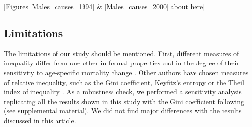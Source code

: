 \documentclass{article}
\begin{document}
\begin{spacing}{1.5}
\begin{center}
[Figures \ref{Males_causes_1994} \& \ref{Males_causes_2000} about here]\\
\end{center}


\subsection*{Limitations} 
The limitations of our study should be mentioned. First, different measures of inequality differ from one other in formal properties and in the degree of their sensitivity to age-specific mortality change \citep{vanraalte2013}. Other authors have chosen measures of relative inequality, such as the Gini coefficient, Keyfitz's entropy or the Theil index of inequality \citep{shkolnikov2003,moser2005world,smits2009,colchero2016emergence}. As a robustness check, we performed a sensitivity analysis replicating all the results shown in this study with the Gini coefficient following \citet{shkolnikov2003} (see supplemental material). We did not find major differences with the results discussed in this article. 


\end{spacing}
\end{document}
